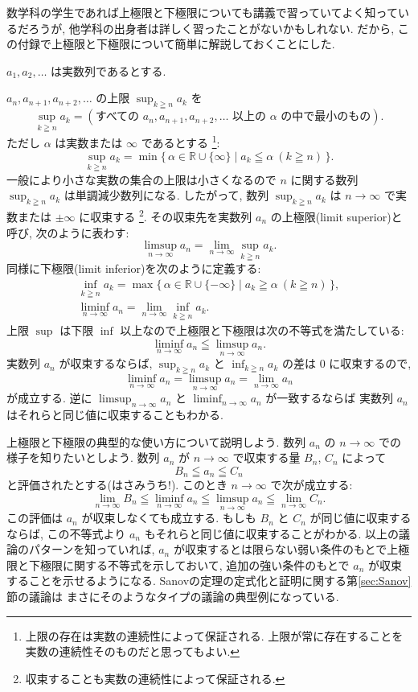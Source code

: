 \documentclass[12pt,twoside]{jarticle}
\newcommand\R{{\mathbb R}} %
\theoremstyle{definition} %
\theoremstyle{definition} %
\theoremstyle{definition} %
\numberwithin{theorem}{section}
\numberwithin{equation}{section}
\numberwithin{figure}{section}
\numberwithin{table}{section}
\newcommand\secref[1]{第\ref{#1}節}
\begin{document}
数学科の学生であれば上極限と下極限についても講義で習っていてよく知っているだろうが, 
他学科の出身者は詳しく習ったことがないかもしれない. 
だから, この付録で上極限と下極限について簡単に解説しておくことにした.

$a_1,a_2,\ldots$ は実数列であるとする. 

$a_n,a_{n+1},a_{n+2},\ldots$ の上限 $\sup_{k\geqq n} a_k$ を
\[
\sup_{k\geqq n} a_k 
=(\text{すべての $a_n,a_{n+1},a_{n+2},\ldots$ 以上の $\alpha$ の中で最小のもの}).
\]
ただし $\alpha$ は実数または $\infty$ であるとする%
\footnote{上限の存在は実数の連続性によって保証される.
上限が常に存在することを実数の連続性そのものだと思ってもよい.}: 
\[
\sup_{k\geqq n} a_k
=\min\{\,\alpha\in\R\cup\{\infty\}\mid a_k\leqq\alpha\ (k\geqq n)\,\}.
\]
一般により小さな実数の集合の上限は小さくなるので
$n$ に関する数列 $\sup_{k\geqq n} a_k$ は単調減少数列になる.
したがって, 数列 $\sup_{k\geqq n} a_k$ は $n\to\infty$ で実数または $\pm\infty$ に収束する%
\footnote{収束することも実数の連続性によって保証される.}.
その収束先を実数列 $a_n$ の上極限(limit superior)と呼び, 次のように表わす:
\[
\limsup_{n\to\infty} a_n = \lim_{n\to\infty}\sup_{k\geqq n} a_k.
\]
同様に下極限(limit inferior)を次のように定義する:
\begin{gather*}
\inf_{k\geqq n} a_k
=\max\{\,\alpha\in\R\cup\{-\infty\}\mid a_k\geqq\alpha\ (k\geqq n)\,\},
\\
\liminf_{n\to\infty} a_n = \lim_{n\to\infty}\inf_{k\geqq n} a_k.
\end{gather*}
上限 $\sup$ は下限 $\inf$ 以上なので上極限と下極限は次の不等式を満たしている:
\[
\liminf_{n\to\infty} a_n \leqq \limsup_{n\to\infty} a_n.
\]
実数列 $a_n$ が収束するならば, $\sup_{k\geqq n} a_k$ と $\inf_{k\geqq n} a_k$ 
の差は $0$ に収束するので,
\[
\liminf_{n\to\infty} a_n = \limsup_{n\to\infty} a_n = \lim_{n\to\infty} a_n
\]
が成立する. 逆に $\limsup_{n\to\infty} a_n$ と $\liminf_{n\to\infty} a_n$ が一致するならば
実数列 $a_n$ はそれらと同じ値に収束することもわかる.

上極限と下極限の典型的な使い方について説明しよう.
数列 $a_n$ の $n\to\infty$ での様子を知りたいとしよう.
数列 $a_n$ が $n\to\infty$ で収束する量 $B_n$, $C_n$ によって
\[
B_n \leqq a_n \leqq C_n
\]
と評価されたとする(はさみうち!). このとき $n\to\infty$ で次が成立する:
\[
\lim_{n\to\infty} B_n 
\leqq \liminf_{n\to\infty} a_n 
\leqq \limsup_{n\to\infty} a_n
\leqq \lim_{n\to\infty} C_n.
\] 
この評価は $a_n$ が収束しなくても成立する.
もしも $B_n$ と $C_n$ が同じ値に収束するならば, 
この不等式より $a_n$ もそれらと同じ値に収束することがわかる.
以上の議論のパターンを知っていれば, 
$a_n$ が収束するとは限らない弱い条件のもとで上極限と下極限に関する不等式を示しておいて, 
追加の強い条件のもとで $a_n$ が収束することを示せるようになる.
Sanovの定理の定式化と証明に関する\secref{sec:Sanov}の議論は
まさにそのようなタイプの議論の典型例になっている.
\end{document}
